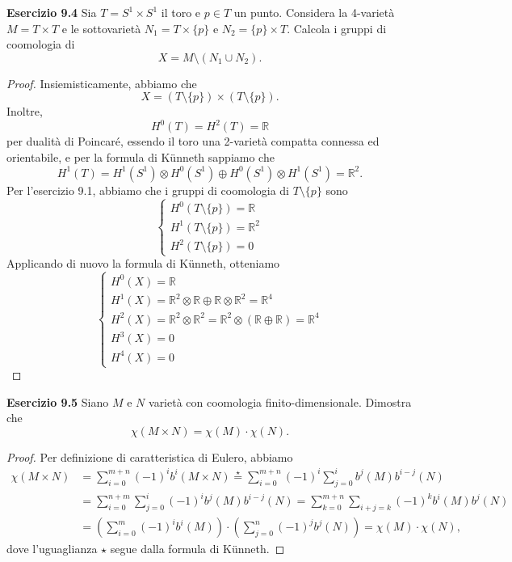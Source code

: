 \documentclass[a4paper]{article}
\newcommand{\R}{\mathbb{R}}
\theoremstyle{definition}
\theoremstyle{definition}
\theoremstyle{remark}
\theoremstyle{definition}
\begin{document}
\textbf{Esercizio 9.4}
Sia $T = S^1 \times S^1$ il toro e $p \in T$ un punto. Considera la 4-varietà $M = T \times T$ e le sottovarietà $N_1 = T \times \{p\}$ e $N_2 = \{p\} \times T$. Calcola i gruppi di coomologia di
\[
    X = M \setminus (N_1 \cup N_2).
\]
\begin{proof}
    Insiemisticamente, abbiamo che $$X=(T \setminus \{p\}) \times (T \setminus \{p\}).$$
    Inoltre, $$H^0(T)=H^2(T)=\R$$ per dualità di Poincaré, essendo il toro una 2-varietà compatta connessa ed orientabile, e per la formula di Künneth sappiamo che
    $$H^1(T)=H^1(S^1) \otimes H^0(S^1) \oplus H^0(S^1) \otimes H^1(S^1)=\R^2.$$
    Per l'esercizio 9.1, abbiamo che i gruppi di coomologia di $T
        \setminus \{p\}$ sono
    \[
        \begin{cases}
            H^0(T \setminus \{p\}) = \R   \\
            H^1(T \setminus \{p\}) = \R^2 \\
            H^2(T \setminus \{p\}) = 0
        \end{cases}
    \]
    Applicando di nuovo la formula di Künneth, otteniamo
    \[
        \begin{cases}
            H^0(X) = \R                                             \\
            H^1(X) = \R^2\otimes\R \oplus \R\otimes\R^2 = \R^4      \\
            H^2(X) = \R^2\otimes \R^2= \R^2\otimes(\R\oplus\R)=\R^4 \\
            H^3(X) = 0                                              \\
            H^4(X) = 0
        \end{cases}
    \]
\end{proof}

\textbf{Esercizio 9.5}
Siano $M$ e $N$ varietà con coomologia finito-dimensionale. Dimostra che
\[
    \chi(M \times N) = \chi(M) \cdot \chi(N).
\]
\begin{proof}
    Per definizione di caratteristica di Eulero, abbiamo
    \[
        \begin{aligned}
            \chi(M \times N) & = \sum_{i=0}^{m+n} (-1)^i b^i(M \times N) \overset{\star}{=} \sum_{i=0}^{m+n} (-1)^i \sum_{j=0}^{i} b^j(M) b^{i-j}(N) \\
                             & = \sum_{i=0}^{n+m} \sum_{j=0}^{i} (-1)^i b^j(M) b^{i-j}(N) =  \sum_{k=0}^{m+n}\sum_{i+j=k} (-1)^k b^i(M) b^j(N)       \\
                             & = \left(\sum_{i=0}^{m} (-1)^i b^i(M)\right)\cdot \left(\sum_{j=0}^{n} (-1)^j b^j(N)\right) = \chi(M) \cdot \chi(N),
        \end{aligned}
    \]
    dove l'uguaglianza $\star$ segue dalla formula di Künneth.
\end{proof}
\end{document}
